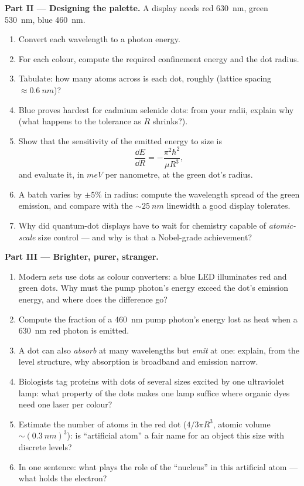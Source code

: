 \begin{problem}
\medskip\noindent\textbf{Part II --- Designing the palette.}
A display needs red \qty{630}{nm}, green \qty{530}{nm}, blue
\qty{460}{nm}.
\begin{enumerate}[resume]
  \item Convert each wavelength to a photon energy.
  \item For each colour, compute the required confinement energy and
        the dot radius.
  \item Tabulate: how many atoms across is each dot, roughly
        (lattice spacing $\approx \qty{0.6}{nm}$)?
  \item Blue proves hardest for cadmium selenide dots: from your
        radii, explain why (what happens to the tolerance as $R$
        shrinks?).
  \item Show that the sensitivity of the emitted energy to size is
        \[
        \frac{\dd E}{\dd R} = -\frac{\pi^2\hbar^2}{\mu R^3} ,
        \]
        and evaluate it, in $\unit{meV}$ per nanometre, at the green
        dot's radius.
  \item A batch varies by $\pm5\%$ in radius: compute the wavelength
        spread of the green emission, and compare with the
        $\sim\qty{25}{nm}$ linewidth a good display tolerates.
  \item Why did quantum-dot displays have to wait for chemistry
        capable of \emph{atomic-scale} size control --- and why is
        that a Nobel-grade achievement?
\end{enumerate}

\medskip\noindent\textbf{Part III --- Brighter, purer, stranger.}
\begin{enumerate}[resume]
  \item Modern sets use dots as colour converters: a blue LED
        illuminates red and green dots. Why must the pump photon's
        energy exceed the dot's emission energy, and where does the
        difference go?
  \item Compute the fraction of a \qty{460}{nm} pump photon's energy
        lost as heat when a \qty{630}{nm} red photon is emitted.
  \item A dot can also \emph{absorb} at many wavelengths but
        \emph{emit} at one: explain, from the level structure, why
        absorption is broadband and emission narrow.
  \item Biologists tag proteins with dots of several sizes excited by
        one ultraviolet lamp: what property of the dots makes one
        lamp suffice where organic dyes need one laser per colour?
  \item Estimate the number of atoms in the red dot ($4/3\pi R^3$,
        atomic volume $\sim(\qty{0.3}{nm})^3$): is ``artificial
        atom'' a fair name for an object this size with discrete
        levels?
  \item In one sentence: what plays the role of the ``nucleus'' in
        this artificial atom --- what holds the electron?
\end{enumerate}


\end{problem}
